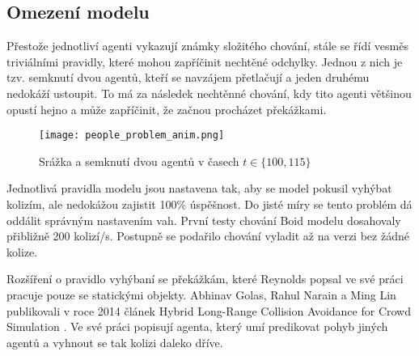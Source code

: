 \subsection{Omezení modelu}
Přestože jednotliví agenti vykazují známky složitého chování, stále se řídí vesměs triviálními pravidly, které mohou zapříčinit nechtěné odchylky. Jednou z nich je tzv. semknutí dvou agentů, kteří se navzájem přetlačují a jeden druhému nedokáží ustoupit. To má za následek nechtěnné chování, kdy tito agenti většinou opustí hejno a může zapříčinit, že začnou procházet překážkami. 
\begin{figure}[H]
	\texttt{[image: people\_problem\_anim.png]}
	\centering
	\caption{Srážka a semknutí dvou agentů v časech $t\in\{ 100, 115\} $}
\end{figure}
Jednotlivá pravidla modelu jsou nastavena tak, aby se model pokusil vyhýbat kolizím, ale nedokážou zajistit 100\% úspěšnost. Do jisté míry se tento problém dá oddálit správným nastavením vah. První testy chování Boid modelu dosahovaly přibližně 200 kolizí/s. Postupně se podařilo chování vyladit až na verzi bez žádné kolize. 
\par
Rozšíření o pravidlo vyhýbaní se překážkám, které Reynolds popsal ve své práci \cite{ReynoldsBoidNoBump} pracuje pouze se statickými objekty. Abhinav Golas, Rahul Narain a Ming Lin publikovali v roce 2014 článek Hybrid Long-Range Collision Avoidance for Crowd Simulation \cite{Golas2013}. Ve své práci popisují agenta, který umí predikovat pohyb jiných agentů a vyhnout se tak kolizi daleko dříve. 